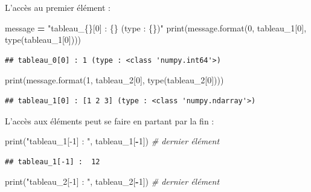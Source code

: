 \documentclass[12pt,]{book}
\newenvironment{Shaded}{\begin{snugshade}}{\end{snugshade}}
\newcommand{\DecValTok}[1]{\textcolor[rgb]{0.00,0.00,0.81}{#1}}
\newcommand{\SpecialCharTok}[1]{\textcolor[rgb]{0.00,0.00,0.00}{#1}}
\newcommand{\StringTok}[1]{\textcolor[rgb]{0.31,0.60,0.02}{#1}}
\newcommand{\CommentTok}[1]{\textcolor[rgb]{0.56,0.35,0.01}{\textit{#1}}}
\newcommand{\OperatorTok}[1]{\textcolor[rgb]{0.81,0.36,0.00}{\textbf{#1}}}
\newcommand{\BuiltInTok}[1]{#1}
\newcommand{\NormalTok}[1]{#1}
\numberwithin{equation}{section}
\numberwithin{countremarque}{section}
\begin{document}
L'accès au premier élément :

\begin{Shaded}
\begin{Highlighting}[]
\NormalTok{message }\OperatorTok{=} \StringTok{"tableau_}\SpecialCharTok{\{\}}\StringTok{[0] : }\SpecialCharTok{\{\}}\StringTok{ (type : }\SpecialCharTok{\{\}}\StringTok{)"}
\BuiltInTok{print}\NormalTok{(message.}\BuiltInTok{format}\NormalTok{(}\DecValTok{0}\NormalTok{, tableau_1[}\DecValTok{0}\NormalTok{], }\BuiltInTok{type}\NormalTok{(tableau_1[}\DecValTok{0}\NormalTok{])))}
\end{Highlighting}
\end{Shaded}

\begin{lstlisting}
## tableau_0[0] : 1 (type : <class 'numpy.int64'>)
\end{lstlisting}

\begin{Shaded}
\begin{Highlighting}[]
\BuiltInTok{print}\NormalTok{(message.}\BuiltInTok{format}\NormalTok{(}\DecValTok{1}\NormalTok{, tableau_2[}\DecValTok{0}\NormalTok{], }\BuiltInTok{type}\NormalTok{(tableau_2[}\DecValTok{0}\NormalTok{])))}
\end{Highlighting}
\end{Shaded}

\begin{lstlisting}
## tableau_1[0] : [1 2 3] (type : <class 'numpy.ndarray'>)
\end{lstlisting}

L'accès aux éléments peut se faire en partant par la fin :

\begin{Shaded}
\begin{Highlighting}[]
\BuiltInTok{print}\NormalTok{(}\StringTok{"tableau_1[-1] : "}\NormalTok{, tableau_1[}\OperatorTok{-}\DecValTok{1}\NormalTok{]) }\CommentTok{# dernier élément}
\end{Highlighting}
\end{Shaded}

\begin{lstlisting}
## tableau_1[-1] :  12
\end{lstlisting}

\begin{Shaded}
\begin{Highlighting}[]
\BuiltInTok{print}\NormalTok{(}\StringTok{"tableau_2[-1] : "}\NormalTok{, tableau_2[}\OperatorTok{-}\DecValTok{1}\NormalTok{]) }\CommentTok{# dernier élément}
\end{Highlighting}
\end{Shaded}
\end{document}

